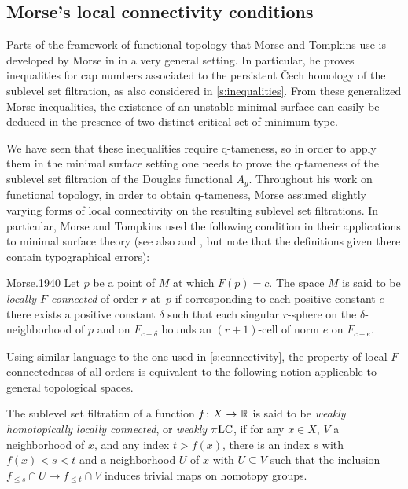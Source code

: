 \subsection{Morse's local connectivity conditions}

Parts of the framework of functional topology that Morse and Tompkins use is developed by Morse in \cite{Morse.1940} in a very general setting. 
In particular, he proves inequalities for cap numbers associated to the persistent \v{C}ech homology of the sublevel set filtration, as also considered in \cref{s:inequalities}.
From these generalized Morse inequalities, the existence of an unstable minimal surface can easily be deduced in the presence of two distinct critical set of minimum type.

We have seen that these inequalities require q-tameness, so in order to apply them in the minimal surface setting %
one needs to prove the \mbox{q-tameness} of the sublevel set filtration of the Douglas functional $A_g$.
Throughout his work on functional topology, in order to obtain \mbox{q-tameness}, Morse assumed slightly varying forms of local connectivity on the resulting sublevel set filtrations.
In particular, Morse and Tompkins used the following condition in their applications to minimal surface theory (see also \cite[p.~ 25]{Morse.1938} and \cite[p.~464]{Morse.1939}, but note that the definitions given there contain typographical errors):
\begin{displaycquote}[p.~431]{Morse.1940}
	Let $p$ be a point of $M$ at which $F(p)=c$.
	The space $M$ is said to be \emph{locally $F$-connected} of order $r$ at~$p$ if corresponding to each positive constant $e$ there exists a positive constant $\delta$ such that each singular $r$-sphere on the $\delta$-neighborhood of $p$ and on $F_{c+\delta}$ bounds an $(r+1)$-cell of norm $e$ on $F_{c+e}$.
\end{displaycquote}
Using similar language to the one used in \cref{s:connectivity}, the property of local $F$-connectedness of all orders is equivalent to the following notion applicable to general topological spaces.

\begin{defi}
	The sublevel set filtration of a function $f \colon X \to \mathbb{R}$ is said to be \emph{weakly homotopically locally connected}, or \emph{weakly $\pi\mathrm{LC}$}, if for any $x \in X$, $V$ a neighborhood of $x$, and any index $t > f(x)$, there is an index $s$ with $f(x) < s < t$ and a neighborhood $U$ of $x$ with $U \subseteq V$ such that the inclusion $f_{\leq s} \cap U \to f_{\leq t} \cap V$ induces trivial maps on homotopy groups.
\end{defi}

